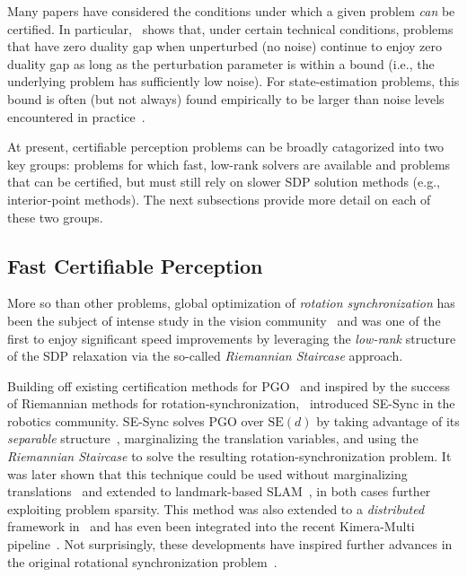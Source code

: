 \documentclass[lettersize,journal]{IEEEtran}
\begin{document}
Many papers have considered the conditions under which a given problem \emph{can} be certified. In particular,~\cite{cifuentesLocalStabilitySemidefinite2022} shows that, under certain technical conditions, problems that have zero duality gap when unperturbed (no noise) continue to enjoy zero duality gap as long as the perturbation parameter is within a bound (i.e., the underlying problem has sufficiently low noise). For state-estimation problems, this bound is often (but not always) found empirically to be larger than noise levels encountered in practice~\cite{rosenSESyncCertifiablyCorrect2019, tianDistributedCertifiablyCorrect2021, erikssonRotationAveragingStrong2018}.

At present, certifiable perception problems can be broadly catagorized into two key groups: problems for which fast, low-rank solvers are available and problems that can be certified, but must still rely on slower SDP solution methods (e.g., interior-point methods). The next subsections provide more detail on each of these two groups.

\subsection{Fast Certifiable Perception}\label{sec:FastPerception}

More so than other problems, global optimization of \emph{rotation synchronization} has been the subject of intense study in the vision community~\cite{wilsonWhenRotationsAveraging2016, erikssonRotationAveragingStrong2018, brynteTightnessSemidefiniteRelaxations2022} and was one of the first to enjoy significant speed improvements by leveraging the \emph{low-rank} structure of the SDP relaxation via the so-called \emph{Riemannian Staircase} approach\cite{bandeiraTightnessMaximumLikelihood2017, boumalNonconvexBurerMonteiro2016}. 

Building off existing certification methods for PGO~\cite{carloneLagrangianDuality3D2015} and inspired by the success of Riemannian methods for rotation-synchronization,~\cite{rosenSESyncCertifiablyCorrect2019} introduced SE-Sync in the robotics community. SE-Sync solves PGO over $\mbox{SE}(d)$ by taking advantage of its \emph{separable} structure~\cite{khosoussiSparseSeparableSLAM2016}, marginalizing the translation variables, and using the \emph{Riemannian Staircase} to solve the resulting rotation-synchronization problem. It was later shown that this technique could be used without marginalizing translations~\cite{brialesCartanSyncFastGlobal2017} and extended to landmark-based SLAM~\cite{holmesEfficientGlobalOptimality2023}, in both cases further exploiting problem sparsity. This method was also extended to a \emph{distributed} framework in~\cite{tianDistributedCertifiablyCorrect2021} and has even been integrated into the recent Kimera-Multi pipeline~\cite{tianKimeraMultiRobustDistributed2022}. Not surprisingly, these developments have inspired further advances in the original rotational synchronization problem~\cite{dellaertShonanRotationAveraging2020}. 
\end{document}
